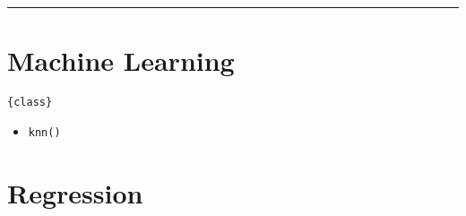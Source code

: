 \documentclass[
]{book}
\providecommand{\tightlist}{%
  \setlength{\itemsep}{0pt}\setlength{\parskip}{0pt}}
\begin{document}
\begin{center}\rule{0.5\linewidth}{0.5pt}\end{center}

\hypertarget{machine-learning}{%
\section{Machine Learning}\label{machine-learning}}

\texttt{\{class\}}

\begin{itemize}
\tightlist
\item
  \texttt{knn()}
\end{itemize}

\hypertarget{regression}{%
\section{Regression}\label{regression}}
\end{document}
